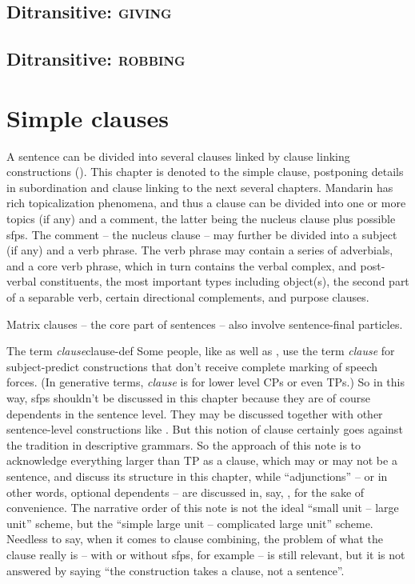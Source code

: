 \documentclass[UTF8, a4paper, oneside, scheme=plain, 12pt]{ctexrep}
\newcommand*{\citepage}[1]{p.~{#1}}
\newcommand*{\term}[1]{\emph{#1}}
\newcommand*{\category}[1]{\textsc{#1}}
\begin{document}
\section{Ditransitive: \category{giving}}\label{sec:verb-valency.giving}


\section{Ditransitive: \category{robbing}}

\chapter{Simple clauses}\label{chap:simple-clause}


A sentence can be divided into several clauses linked by clause linking constructions 
().
This chapter is denoted to the simple clause,
postponing details in subordination and clause linking to the next several chapters.
Mandarin has rich topicalization phenomena,
and thus a clause can be divided into
one or more topics (if any) and a comment,
the latter being the nucleus clause
plus possible \acl{sfp}s.
The comment -- the nucleus clause -- may further be divided into a subject (if any)
and a verb phrase. 
The verb phrase may contain 
a series of adverbials, 
and a core verb phrase, which in turn contains
the verbal complex, and post-verbal constituents,
the most important types including object(s), 
the second part of a separable verb,
certain directional complements,
and purpose clauses.

Matrix clauses -- the core part of sentences -- 
also involve sentence-final particles. 


\begin{infobox}{The term \term{clause}}{clause-def}
    Some people, like \citet[\citepage{140}]{deng2010formal}
    as well as \citet{dixon2009basic},
    use the term \term{clause} for subject-predict constructions 
    that don't receive complete marking of speech forces.
    (In generative terms, \term{clause} is for lower level CPs or even TPs.)
    So in this way, \acl{sfp}s shouldn't be discussed in this chapter because 
    they are of course dependents in the sentence level.
    They may be discussed together with other sentence-level constructions like .
    But this notion of clause certainly goes against the tradition in descriptive grammars.
    So the approach of this note is to acknowledge everything larger than TP as a clause,
    which may or may not be a sentence,
    and discuss its structure in this chapter,
    while ``adjunctions'' -- or in other words, optional dependents -- 
    are discussed in, say, ,
    for the sake of convenience.
    The narrative order of this note is not the ideal ``small unit -- large unit'' scheme,
    but the ``simple large unit -- complicated large unit'' scheme.
    Needless to say,
    when it comes to clause combining, 
    the problem of what the clause really is -- with or without \ac{sfp}s, for example --
    is still relevant,
    but it is not answered by saying ``the construction takes a clause, not a sentence''.
\end{infobox}
\end{document}
